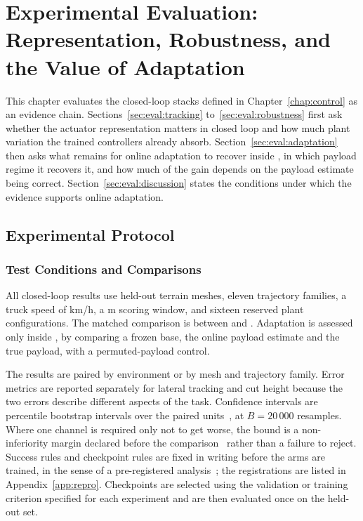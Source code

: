 \chapter{Experimental Evaluation: Representation, Robustness, and the Value of Adaptation}
\label{chap:evaluation}
\fancyhead[RE]{\headfont\small\nouppercase{\leftmark}}

This chapter evaluates the closed-loop stacks defined in Chapter~\ref{chap:control}
as an evidence chain. Sections~\ref{sec:eval:tracking}
to~\ref{sec:eval:robustness} first ask whether the actuator representation
matters in closed loop and how much plant variation the trained controllers
already absorb. Section~\ref{sec:eval:adaptation} then asks what remains for
online adaptation to recover inside \ppoAAMFD{}, in which payload regime it
recovers it, and how much of the gain depends on the payload estimate being
correct. Section~\ref{sec:eval:discussion} states the conditions under which
the evidence supports online adaptation.

\section{Experimental Protocol}
\label{sec:eval:hypotheses}

\subsection{Test Conditions and Comparisons}
\label{sec:eval:matrix}

All closed-loop results use held-out terrain meshes, eleven trajectory families,
a truck speed of \unit[4]{km/h}, a \unit[26]{m} scoring window, and sixteen
reserved plant configurations. The matched comparison is between \ppoROM{} and
\ppoIDFD{}. Adaptation is assessed only inside \ppoAAMFD{}, by comparing a
frozen base, the online payload estimate and the true payload, with a
permuted-payload control.

The results are paired by environment or by mesh and trajectory family. Error
metrics are reported separately for lateral tracking and cut height because the
two errors describe different aspects of the task. Confidence intervals are
percentile bootstrap intervals over the paired
units~\cite{efron1993bootstrap}, at $B=20\,000$ resamples. Where one channel is
required only not to get worse, the bound is a non-inferiority margin declared
before the comparison~\cite{piaggio2012noninferiority} rather than a failure to
reject. Success rules and checkpoint rules are fixed in writing before the arms
are trained, in the sense of a pre-registered
analysis~\cite{nosek2018preregistration}; the registrations are listed in
Appendix~\ref{app:repro}. Checkpoints are selected using the validation or
training criterion specified for each experiment and are then evaluated once on
the held-out set.


